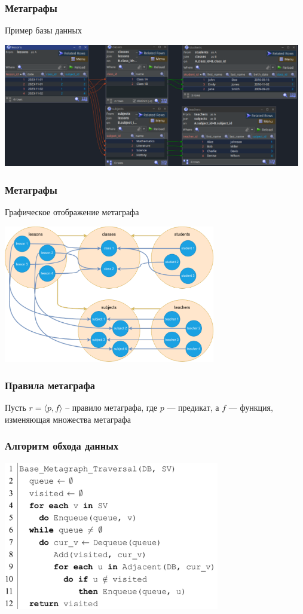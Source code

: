 \documentclass[pdf, hyperref={unicode}, aspectratio=169]{beamer}
\begin{document}
\begin{frame}
\frametitle{Метаграфы}
	Пример базы данных

	\begin{center}
		\includegraphics[width = 13cm]{img/jailer-example-db}
	\end{center}
\end{frame}


\begin{frame}
\frametitle{Метаграфы}
	Графическое отображение метаграфа

	\begin{center}
		\includegraphics[height = 6cm]{img/drawio-metagraph}
	\end{center}
\end{frame}


\begin{frame}
\frametitle{Правила метаграфа}
	Пусть $r = \langle p, f \rangle$ -- правило метаграфа, где $p$ — предикат, а $f$ — функция, изменяющая множества метаграфа
\end{frame}


\begin{frame}
\frametitle{Алгоритм обхода данных}

	\begin{center}
		\includegraphics[height = 6.5cm]{img/algorithm-base}
	\end{center}
\end{frame}
\end{document}
